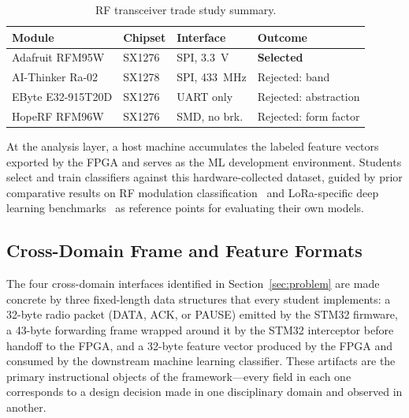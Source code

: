 \documentclass[conference]{IEEEtran}
\begin{document}
\begin{table}[t]
\centering
\caption{RF transceiver trade study summary.}
\label{tab:tradestudy}
\begin{tabular}{l l l l}
\toprule
\textbf{Module} & \textbf{Chipset} & \textbf{Interface} & \textbf{Outcome} \\
\midrule
Adafruit RFM95W   & SX1276 & SPI, 3.3~V   & \textbf{Selected} \\
AI-Thinker Ra-02  & SX1278 & SPI, 433~MHz & Rejected: band \\
EByte E32-915T20D & SX1276 & UART only    & Rejected: abstraction \\
HopeRF RFM96W     & SX1276 & SMD, no brk. & Rejected: form factor \\
\bottomrule
\end{tabular}
\end{table}

At the analysis layer, a host machine accumulates the labeled feature vectors exported by the FPGA and serves as the ML development environment. Students select and train classifiers against this hardware-collected dataset, guided by prior comparative results on RF modulation classification~\cite{b4} and LoRa-specific deep learning benchmarks~\cite{b5} as reference points for evaluating their own models.

\subsection{Cross-Domain Frame and Feature Formats}\label{sec:proto}

The four cross-domain interfaces identified in Section~\ref{sec:problem} are made concrete by three fixed-length data structures that every student implements: a 32-byte radio packet (DATA, ACK, or PAUSE) emitted by the STM32 firmware, a 43-byte forwarding frame wrapped around it by the STM32 interceptor before handoff to the FPGA, and a 32-byte feature vector produced by the FPGA and consumed by the downstream machine learning classifier. These artifacts are the primary instructional objects of the framework---every field in each one corresponds to a design decision made in one disciplinary domain and observed in another.
\end{document}
